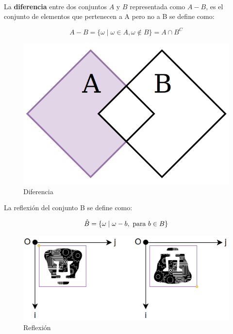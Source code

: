 La \textbf{diferencia} entre dos conjuntos $A$ y $B$ representada como $A-B$, es el conjunto de elementos que pertenecen a A pero no a B se define como:

\begin{equation}
A - B = \{ \omega \mid \omega \in A, \omega \notin B \} = A \cap B^{C}
\label{eqn:diferencia}
\end{equation}

\begin{figure}[H]
\centering
\includegraphics[scale=0.17]{Figures/Conjuntos_Resta.png}
    \caption{Diferencia}
    \label{fig:Diferencia}
\end{figure}

La reflexión del conjunto B se define como:

\begin{equation}
\hat{B} = \{ \omega \mid \omega -b, \textup{ para } b \in B \}
\label{eqn:reflexion}
\end{equation}

\begin{figure}[H]
\centering
\includegraphics[scale=0.32]{Figures/Reflexion.png}
    \caption{Reflexión}
    \label{fig:Reflexion}
\end{figure}


